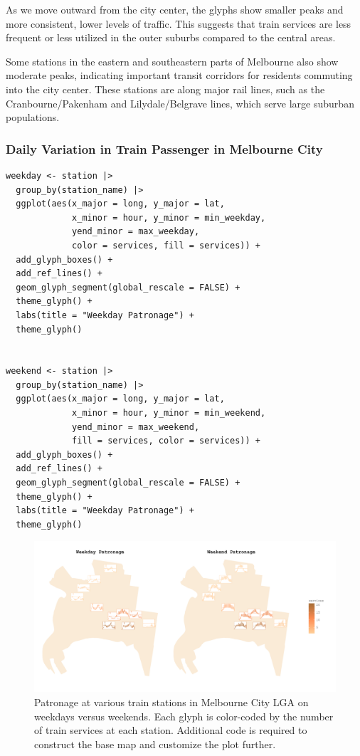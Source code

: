 As we move outward from the city center, the glyphs show smaller peaks and more consistent, lower levels of traffic. This suggests that train services are less frequent or less utilized in the outer suburbs compared to the central areas.

Some stations in the eastern and southeastern parts of Melbourne also show moderate peaks, indicating important transit corridors for residents commuting into the city center. These stations are along major rail lines, such as the Cranbourne/Pakenham and Lilydale/Belgrave lines, which serve large suburban populations.

\subsubsection{Daily Variation in Train Passenger in Melbourne City}\label{daily-variation-in-train-passenger-in-melbourne-city}

\begin{verbatim}
weekday <- station |>
  group_by(station_name) |>
  ggplot(aes(x_major = long, y_major = lat,
             x_minor = hour, y_minor = min_weekday,
             yend_minor = max_weekday,
             color = services, fill = services)) +
  add_glyph_boxes() +
  add_ref_lines() +
  geom_glyph_segment(global_rescale = FALSE) +
  theme_glyph() +
  labs(title = "Weekday Patronage") +
  theme_glyph() 


weekend <- station |>
  group_by(station_name) |>
  ggplot(aes(x_major = long, y_major = lat,
             x_minor = hour, y_minor = min_weekend,
             yend_minor = max_weekend,
             fill = services, color = services)) +
  add_glyph_boxes() +
  add_ref_lines() +
  geom_glyph_segment(global_rescale = FALSE) +
  theme_glyph() +
  labs(title = "Weekday Patronage") +
  theme_glyph() 
\end{verbatim}

\begin{figure}
\includegraphics[width=50in]{figures/weekend_weekday} \caption{Patronage at various train stations in Melbourne City LGA on weekdays versus weekends. Each glyph is color-coded by the number of train services at each station. Additional code is required to construct the base map and customize the plot further.}\label{fig:unnamed-chunk-22}
\end{figure}

